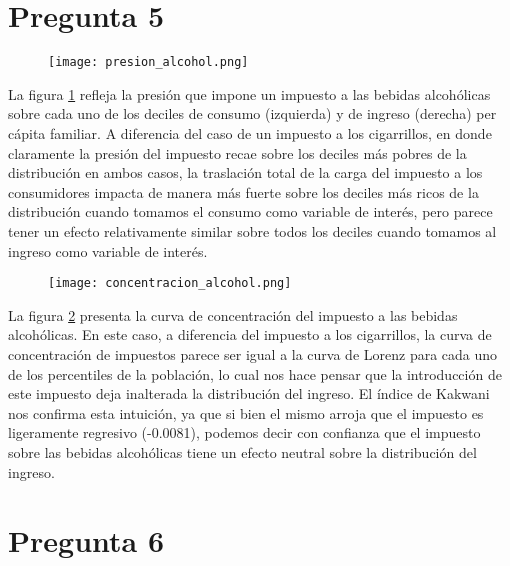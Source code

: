 \documentclass[11pt,oneside]{article}
\begin{document}
	
 	\section*{Pregunta 5}

 	\begin{figure}
    		\centering
    		\texttt{[image: presion\_alcohol.png]}
    		\label{fig:5A}
	\end{figure}

	La figura \ref{fig:5A} refleja la presión que impone un impuesto a las bebidas alcohólicas sobre cada uno de los deciles de consumo (izquierda) y de ingreso (derecha) per cápita familiar. A diferencia del caso de un impuesto a los cigarrillos, en donde claramente la presión del impuesto recae sobre los deciles más pobres de la distribución en ambos casos, la traslación total de la carga del impuesto a los consumidores impacta de manera más fuerte sobre los deciles más ricos de la distribución cuando tomamos el consumo como variable de interés, pero parece tener un efecto relativamente similar sobre todos los deciles cuando tomamos al ingreso como variable de interés.

	\begin{figure}
    		\centering
    		\texttt{[image: concentracion\_alcohol.png]}
    		\label{fig:5B}
	\end{figure}

	La figura \ref{fig:5B} presenta la curva de concentración del impuesto a las bebidas alcohólicas. En este caso, a diferencia del impuesto a los cigarrillos, la curva de concentración de impuestos parece ser igual a la curva de Lorenz para cada uno de los percentiles de la población, lo cual nos hace pensar que la introducción de este impuesto deja inalterada la distribución del ingreso. El índice de Kakwani nos confirma esta intuición, ya que si bien el mismo arroja que el impuesto es ligeramente regresivo (-0.0081), podemos decir con confianza que el impuesto sobre las bebidas alcohólicas tiene un efecto neutral sobre la distribución del ingreso.
 
	
 	\section*{Pregunta 6}
\end{document}
